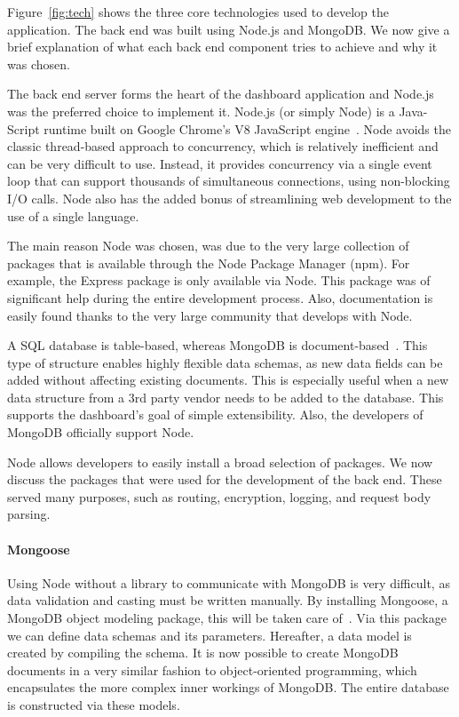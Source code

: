         Figure~\ref{fig:tech} shows the three core technologies used to develop the application. The back end was built using Node.js and MongoDB\@. We now give a brief explanation of what each back end component tries to achieve and why it was chosen.


            The back end server forms the heart of the dashboard application and Node.js was the preferred choice to implement it. Node.js (or simply Node) is a Java-Script runtime built on Google Chrome's V8 JavaScript engine~\cite{NodeJS}. Node avoids the classic thread-based approach to concurrency, which is relatively inefficient and can be very difficult to use. Instead, it provides concurrency via a single event loop that can support thousands of simultaneous connections, using non-blocking I/O calls. Node also has the added bonus of streamlining web development to the use of a single language.
            
            The main reason Node was chosen, was due to the very large collection of packages that is available through the Node Package Manager (npm). For example, the Express package is only available via Node. This package was of significant help during the entire development process. Also, documentation is easily found thanks to the very large community that develops with Node.

            
            A SQL database is table-based, whereas MongoDB is document-based~\cite{MongoDB}. This type of structure enables highly flexible data schemas, as new data fields can be added without affecting existing documents. This is especially useful when a new data structure from a 3rd party vendor needs to be added to the database. This supports the dashboard's goal of simple extensibility. Also, the developers of MongoDB officially support Node.


            Node allows developers to easily install a broad selection of packages. We now discuss the packages that were used for the development of the back end. These served many purposes, such as routing, encryption, logging, and request body parsing. 

            \paragraph{Mongoose} Using Node without a library to communicate with MongoDB is very difficult, as data validation and casting must be written manually. By installing Mongoose, a MongoDB object modeling package, this will be taken care of~\cite{Mongoose}. Via this package we can define data schemas and its parameters. Hereafter, a data model is created by compiling the schema. It is now possible to create MongoDB documents in a very similar fashion to object-oriented programming, which encapsulates the more complex inner workings of MongoDB\@. The entire database is constructed via these models.

